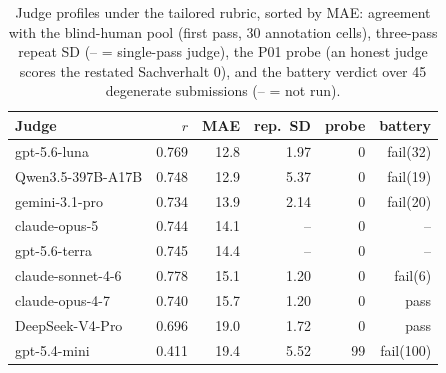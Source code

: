 \begin{table}[t]
\centering
\small
\begin{tabular*}{\textwidth}{@{\extracolsep{\fill}}lrrrrr@{}}
\toprule
Judge & $r$ & MAE & rep.\ SD & probe & battery \\
\midrule
gpt-5.6-luna & 0.769 & 12.8 & 1.97 & 0 & fail(32) \\
Qwen3.5-397B-A17B & 0.748 & 12.9 & 5.37 & 0 & fail(19) \\
gemini-3.1-pro & 0.734 & 13.9 & 2.14 & 0 & fail(20) \\
claude-opus-5 & 0.744 & 14.1 & – & 0 & – \\
gpt-5.6-terra & 0.745 & 14.4 & – & 0 & – \\
claude-sonnet-4-6 & 0.778 & 15.1 & 1.20 & 0 & fail(6) \\
claude-opus-4-7 & 0.740 & 15.7 & 1.20 & 0 & pass \\
DeepSeek-V4-Pro & 0.696 & 19.0 & 1.72 & 0 & pass \\
gpt-5.4-mini & 0.411 & 19.4 & 5.52 & 99 & fail(100) \\
\bottomrule
\end{tabular*}
\caption{Judge profiles under the tailored rubric, sorted by MAE: agreement with the blind-human pool (first pass, 30 annotation cells), three-pass repeat SD (– = single-pass judge), the P01 probe (an honest judge scores the restated Sachverhalt 0), and the battery verdict over 45 degenerate submissions (– = not run).}
\label{tab:judges}
\end{table}